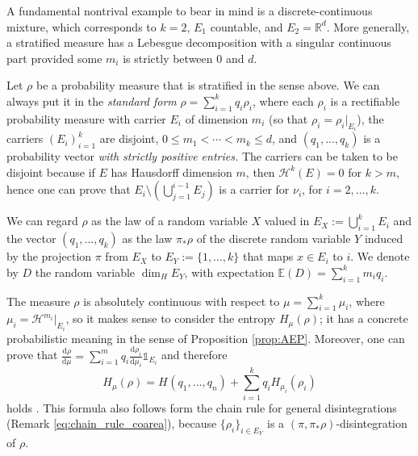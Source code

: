 \documentclass[runningheads]{llncs}
\newcommand{\cf}{\mathds{1}}
\newcommand{\diff}[2]{\frac{\mathrm{d}  #1}{\mathrm{d}  #2}}
\newcommand{\Rr}{\mathbb{R}}
\newcommand{\ent}[1]{H_{#1}}
\begin{document}
A fundamental nontrival example to bear in mind is a discrete-continuous mixture, which corresponds to  $k=2$, $E_1$ countable, and $E_2 = \Rr^d$. More generally, a stratified measure has a Lebesgue decomposition with a singular continuous part provided some $m_i$ is strictly between $0$ and $d$.

Let $\rho$ be a probability measure that is stratified in the sense above. We can always put it in the \emph{standard form} 
$
\rho = \sum_{i=1}^k q_i \rho_i$, 
where each $\rho_i$ is a rectifiable probability measure with carrier $E_i$ of dimension $m_i$ (so that $\rho_i = \rho_i|_{ E_i}$), the carriers $(E_i)_{i=1}^k$ are disjoint, $0 \leq m_1 < \cdots < m_k \leq d$, and $(q_1,...,q_k)$ is a probability vector \emph{with strictly positive entries.} The carriers can be taken to be disjoint because if $E$ has Hausdorff dimension $m$, then $\mathcal H^k(E)=0$  for $k>m$, hence one can prove \cite[Sec. IV-B]{Vigneaux-stratified} that $E_i\setminus (\bigcup_{j=1}^{i-1} E_j)$ is a carrier for $\nu_i$, for $i=2,...,k$.



We can regard $\rho$ as the law of a random variable $X$ valued in $E_X:=\bigcup_{i=1}^k E_i$ and the vector $(q_1,...,q_k)$ as the law $\pi_*\rho$ of the discrete random variable $Y$ induced by the projection $\pi$ from  $E_X$ to $E_Y:=\{1,...,k\}$ that maps $x\in E_i$ to $i$. We denote by $D$ the random variable $\dim_H E_Y$, with expectation $\mathbb E(D)=\sum_{i=1}^k m_i q_i$.

The measure  $\rho$ is absolutely continuous with respect to $\mu = \sum_{i=1}^k \mu_i$, where $\mu_i = \mathcal H^{m_i}|_{ E_i}$, so it makes sense to consider the entropy $H_{\mu}(\rho)$; it has a concrete probabilistic meaning in the sense of Proposition \ref{prop:AEP}. Moreover, one can prove that $\diff{\rho}{\mu} = \sum_{i=1}^m q_i \diff{\rho_i}{\mu_i} \cf_{E_i}$ \cite[Lem. 3]{Vigneaux-stratified} and therefore 
\begin{equation}\label{eq:chain_rule}
\ent{\mu}(\rho) = \ent{}(q_1,...,q_n) + \sum_{i=1}^k q_i \ent{\mu_i}(\rho_i)
\end{equation}
holds \cite[Lem. 4]{Vigneaux-stratified}. This formula also follows form the chain rule for general disintegrations (Remark \ref{eq:chain_rule_coarea}), because $\{\rho_i\}_{i\in E_Y}$ is a $(\pi,\pi_*\rho)$-disintegration of $\rho$. 
\end{document}
